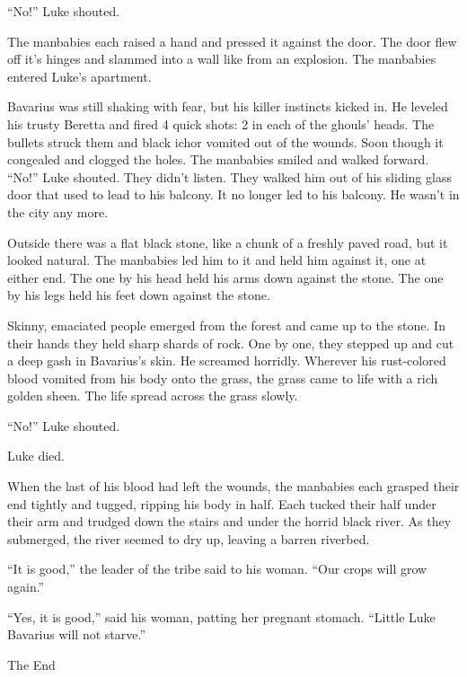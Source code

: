 ``No!'' Luke shouted.

The manbabies each raised a hand and pressed it against the door.
The door flew off it's hinges and slammed into a wall like from an
explosion. The manbabies entered Luke's apartment.

Bavarius was still shaking with fear, but his killer instincts
kicked in. He leveled his trusty Beretta and fired 4 quick shots: 2
in each of the ghouls' heads. The bullets struck them and black
ichor vomited out of the wounds. Soon though it congealed and
clogged the holes. The manbabies smiled and walked forward. ``No!''
Luke shouted. They didn't listen. They walked him out of his
sliding glass door that used to lead to his balcony. It no longer
led to his balcony. He wasn't in the city any more.

Outside there was a flat black stone, like a chunk of a freshly
paved road, but it looked natural. The manbabies led him to it and
held him against it, one at either end. The one by his head held
his arms down against the stone. The one by his legs held his feet
down against the stone.

Skinny, emaciated people emerged from the forest and came up to the
stone. In their hands they held sharp shards of rock. One by one,
they stepped up and cut a deep gash in Bavarius's skin. He screamed
horridly. Wherever his rust-colored blood vomited from his body
onto the grass, the grass came to life with a rich golden sheen.
The life spread across the grass slowly.

``No!'' Luke shouted.

Luke died.

When the last of his blood had left the wounds, the manbabies each
grasped their end tightly and tugged, ripping his body in half.
Each tucked their half under their arm and trudged down the stairs
and under the horrid black river. As they submerged, the river
seemed to dry up, leaving a barren riverbed.

``It is good,'' the leader of the tribe said to his woman. ``Our crops
will grow again.''

``Yes, it is good,'' said his woman, patting her pregnant stomach.
``Little Luke Bavarius will not starve.''



The End 
 



